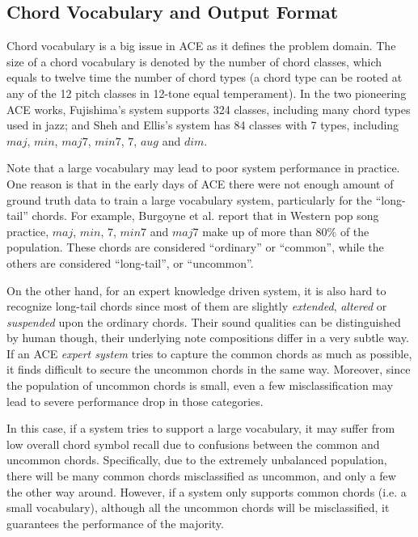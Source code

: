 \subsection{Chord Vocabulary and Output Format} \label{sec:2-vocab}
Chord vocabulary is a big issue in ACE as it defines the problem domain. The size of a chord vocabulary is denoted by the number of chord classes, which equals to twelve time the number of chord types (a chord type can be rooted at any of the 12 pitch classes in 12-tone equal temperament). In the two pioneering ACE works, Fujishima's system \cite{fujishima1999realtime} supports 324 classes, including many chord types used in jazz; and Sheh and Ellis's system \cite{sheh2003chord} has 84 classes with 7 types, including $maj$, $min$, $maj7$, $min7$, $7$, $aug$ and $dim$.

Note that a large vocabulary may lead to poor system performance in practice. One reason is that in the early days of ACE there were not enough amount of ground truth data to train a large vocabulary system, particularly for the ``long-tail'' chords. For example, Burgoyne et al. \cite{burgoyne2011expert} report that in Western pop song practice, $maj$, $min$, $7$, $min7$ and $maj7$ make up of more than $80\%$ of the population. These chords are considered ``ordinary'' or ``common'', while the others are considered ``long-tail'', or ``uncommon''.

On the other hand, for an expert knowledge driven system, it is also hard to recognize long-tail chords since most of them are slightly {\it extended}, {\it altered} or {\it suspended} upon the ordinary chords. Their sound qualities can be distinguished by human though, their underlying note compositions differ in a very subtle way. If an ACE {\it expert system} tries to capture the common chords as much as possible, it finds difficult to secure the uncommon chords in the same way. Moreover, since the population of uncommon chords is small, even a few misclassification may lead to severe performance drop in those categories.

In this case, if a system tries to support a large vocabulary, it may suffer from low overall chord symbol recall due to confusions between the common and uncommon chords. Specifically, due to the extremely unbalanced population, there will be many common chords misclassified as uncommon, and only a few the other way around. However, if a system only supports common chords (i.e. a small vocabulary), although all the uncommon chords will be misclassified, it guarantees the performance of the majority. \cite{deng2016hybrid}

